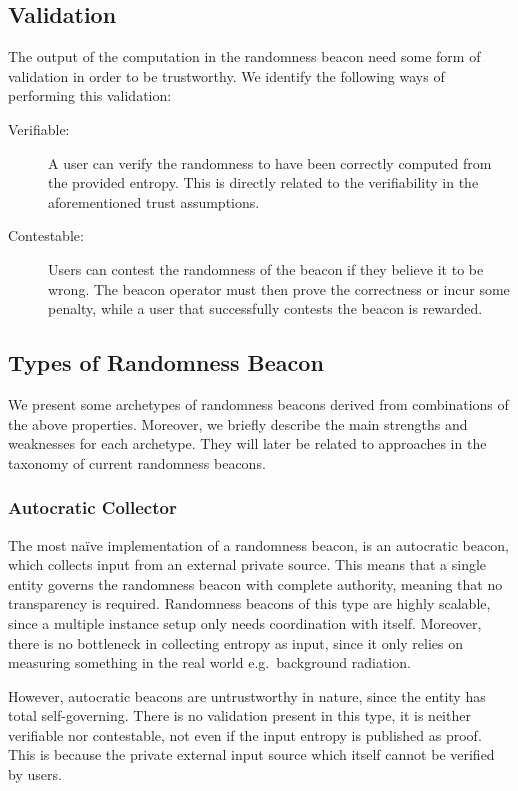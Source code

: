 \subsection{Validation}
The output of the computation in the randomness beacon need some form of validation in order to be trustworthy.
We identify the following ways of performing this validation:

\begin{description}
    \item[Verifiable:]
        A user can verify the randomness to have been correctly computed from the provided entropy.
        This is directly related to the verifiability in the aforementioned trust assumptions.

    \item[Contestable:]
        Users can contest the randomness of the beacon if they believe it to be wrong.
        The beacon operator must then prove the correctness or incur some penalty, while a user that successfully contests the beacon is rewarded. 
\end{description}

\subsection{Types of Randomness Beacon}
We present some archetypes of randomness beacons derived from combinations of the above properties.
Moreover, we briefly describe the main strengths and weaknesses for each archetype.
They will later be related to approaches in the taxonomy of current randomness beacons.

\subsubsection{Autocratic Collector}\label{ssub:autocratic}
The most naïve implementation of a randomness beacon, is an autocratic beacon, which collects input from an external private source.
This means that a single entity governs the randomness beacon with complete authority, meaning that no transparency is required.
Randomness beacons of this type are highly scalable, since a multiple instance setup only needs coordination with itself.
Moreover, there is no bottleneck in collecting entropy as input, since it only relies on measuring something in the real world e.g.\ background radiation.

However, autocratic beacons are untrustworthy in nature, since the entity has total self-governing.
There is no validation present in this type, it is neither verifiable nor contestable, not even if the input entropy is published as proof.
This is because the private external input source which itself cannot be verified by users.

